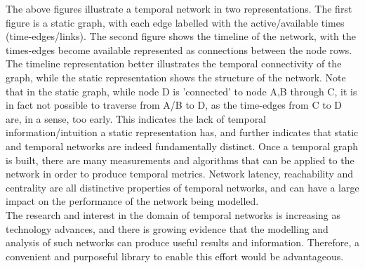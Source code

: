 \begin{introduction}
\begin{figure}
\end{figure}
The above figures illustrate a temporal network in two representations. The first figure is a static graph, with each edge labelled with the active/available times (time-edges/links). The second figure shows the timeline of the network, with the times-edges become available represented as connections between the node rows. The timeline representation better illustrates the temporal connectivity of the graph, while the static representation shows the structure of the network. Note that in the static graph, while node D is 'connected' to node A,B through C, it is in fact not possible to traverse from A/B to D, as the time-edges from C to D are, in a sense, too early. This indicates the lack of temporal information/intuition a static representation has, and further indicates that static and temporal networks are indeed fundamentally distinct.
Once a temporal graph is built, there are many measurements and algorithms that can be applied to the network in order to produce temporal metrics. Network latency, reachability and centrality are all distinctive properties of temporal networks, and can have a large impact on the performance of the network being modelled.\\
The research and interest in the domain of temporal networks is increasing as technology advances, and there is growing evidence \cite{social_metrics} that the modelling and analysis of such networks can produce useful results and information. Therefore, a convenient and purposeful library to enable this effort would be advantageous.
\end{introduction}
\vspace{1cm}
\clearpage